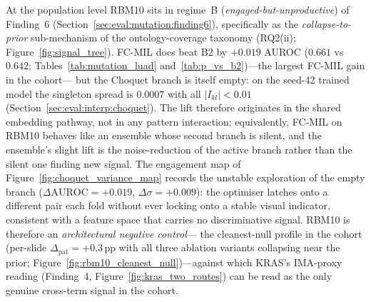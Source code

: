 At the population level RBM10 sits in regime~B
(\emph{engaged-but-unproductive}) of Finding~6
(Section~\ref{sec:eval:mutation:finding6}), specifically as the
\emph{collapse-to-prior} sub-mechanism of the ontology-coverage
taxonomy (RQ2(ii); Figure~\ref{fig:signal_tree}).
FC-MIL does beat B2 by $+0.019$ AUROC
($0.661$ vs $0.642$; Tables~\ref{tab:mutation_luad}
and~\ref{tab:p_vs_b2})---the largest FC-MIL gain in the cohort---%
but the Choquet branch is itself empty: on the seed-42 trained
model the singleton spread is $0.0007$ with all $|I_{kl}| < 0.01$
(Section~\ref{sec:eval:interp:choquet}).
The lift therefore originates in the shared embedding pathway,
not in any pattern interaction; equivalently, FC-MIL on RBM10
behaves like an ensemble whose second branch is silent, and the
ensemble's slight lift is the noise-reduction of the active
branch rather than the silent one finding new signal.
The engagement map of Figure~\ref{fig:choquet_variance_map}
records the unstable exploration of the empty branch
($\Delta\mathrm{AUROC} = +0.019$, $\Delta\sigma = +0.009$): the
optimiser latches onto a different pair each fold without ever
locking onto a stable visual indicator, consistent with a
feature space that carries no discriminative signal.
RBM10 is therefore an \emph{architectural negative control}---%
the cleanest-null profile in the cohort
(per-slide $\Delta_{\mathrm{pat}} = +0.3$\,pp with all three
ablation variants collapsing near the prior;
Figure~\ref{fig:rbm10_cleanest_null})---against which KRAS's
IMA-proxy reading (Finding~4,
Figure~\ref{fig:kras_two_routes}) can be read as the only
genuine cross-term signal in the cohort.


